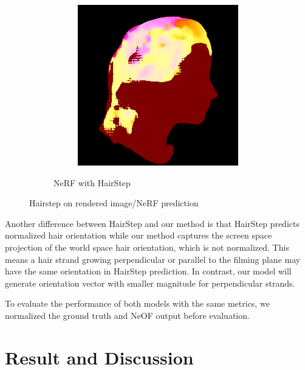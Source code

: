 \documentclass{article}
\begin{document}
\begin{figure}[h]
\begin{subfigure}{0.48\linewidth}
\begin{subfigure}{0.48\textwidth}
        \end{subfigure}
        \hfill
        \begin{subfigure}{0.48\textwidth}
            \centering
            \includegraphics[width=\textwidth]{./images/baseline-method/pred_6_hairstep.png}
        \end{subfigure}
        \caption{NeRF with HairStep}
    \end{subfigure}

    \caption{Hairstep on rendered image/NeRF prediction}
    \label{fig:nerf_hairstep}
\end{figure}

Another difference between HairStep and our method is that HairStep predicts normalized hair orientation while our method captures the screen space projection of the world space hair orientation, which is not normalized. This means a hair strand growing perpendicular or parallel to the filming plane may have the same orientation in HairStep prediction. In contrast, our model will generate orientation vector with smaller magnitude for perpendicular strands.

To evaluate the performance of both models with the same metrics, we normalized the ground truth and NeOF output before evaluation.

\section{Result and Discussion}
\end{document}

